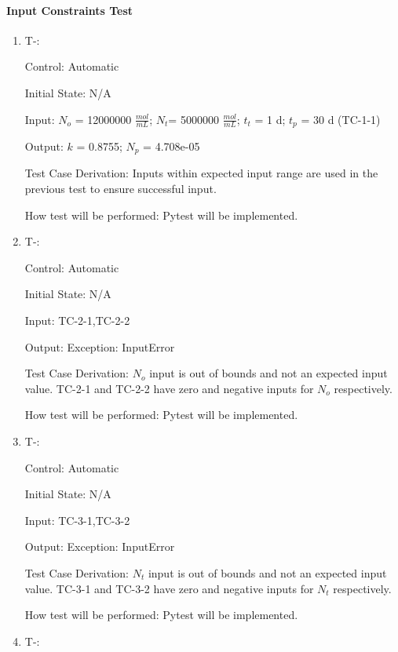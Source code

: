 \documentclass[12pt, titlepage]{article}
\newcounter{tinnum} %
\begin{document}
\paragraph{Input Constraints Test}

\begin{enumerate}

\item{T-}\thetinnum\label{T-1}:

Control: Automatic
					
Initial State: N/A
					
Input: $N_{o}$ = 12000000 $\frac{mol}{mL}$; $N_{t}$= 5000000 $\frac{mol}{mL}$; 
$t_{t}$ = 1 d; $t_{p}$ = 30 d (TC-1-1)
					
Output: $k$ = 0.8755; $N_p$ = 4.708e-05

Test Case Derivation: Inputs within expected input range are used in the 
previous test to ensure successful input.
					
How test will be performed: Pytest will be implemented.
					
\item{T-}\thetinnum\label{T-2}:

Control: Automatic
					
Initial State: N/A
					
Input: TC-2-1,TC-2-2
					
Output: Exception: InputError

Test Case Derivation: $N_{o}$ input is out of bounds and not an expected input 
value. TC-2-1 and TC-2-2 have zero and negative inputs for $N_{o}$  
respectively. 

How test will be performed: Pytest will be implemented.


\item{T-}\thetinnum\label{T-3}:

Control: Automatic
					
Initial State: N/A
					
Input: TC-3-1,TC-3-2
					
Output: Exception: InputError

Test Case Derivation: $N_{t}$ input is out of bounds and not an expected input 
value. TC-3-1 and TC-3-2 have zero and negative inputs for $N_{t}$ respectively. 

How test will be performed: Pytest will be implemented.


\item{T-}\thetinnum\label{T-4}:


\end{enumerate}
\end{document}
